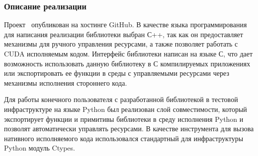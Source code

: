 \subsubsection{Описание реализации}

Проект~\cite{net:cubool_project} опубликован на хостинге GitHub. В качестве языка программирования для написания реализации библиотеки выбран С++, так как он предоставляет механизмы для ручного управления ресурсами, а также позволяет работать с CUDA исполняемым кодом. Интерфейс библиотеки написан на языке С, что дает возможность использовать данную библиотеку в С компилируемых приложениях или экспортировать ее функции в среды с управляемыми ресурсами через механизмы исполнения стороннего кода.

Для работы конечного пользователя с разработанной библиотекой в тестовой инфраструктуре на языке Python был реализован слой совместимости, который экспортирует функции и примитивы библиотеки в среду исполнения Python и позволят автоматически управлять ресурсами. В качестве инструмента для вызова нативного исполняемого кода использовался стандартный для инфраструктуры Python модуль Ctypes.